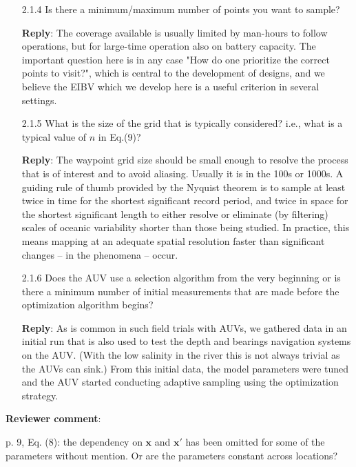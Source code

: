 \documentclass[a4paper]{article}
\newcommand{\bx}{ {\boldsymbol x} }
\def\revcom{\textbf{Reviewer comment}}
\def\reply{\textbf{Reply}}
\begin{document}
\begin{answers}
\begin{itemize}[noitemsep,topsep=0pt,parsep=0pt,partopsep=0pt]
\item[2.1.4] Is there a minimum/maximum number of points you want to sample?\par

\reply: The coverage available is usually limited by man-hours to follow operations, but for large-time operation also on battery capacity. The important question here is in any case "How do one prioritize the correct points to visit?", which is central to the development of designs, and we believe the EIBV which we develop here is a useful criterion in several settings. 
\vspace{1em}

\item[2.1.5] What is the size of the grid that is typically considered? i.e., what is a typical value of $n$ in Eq.(9)?\par 

\reply: The waypoint grid size should be small enough to resolve the process that is of interest and to avoid aliasing. Usually it is in the 100s or 1000s. A guiding rule of thumb provided by the Nyquist theorem is to sample at least twice in time for the shortest significant record period, and twice in space for the shortest significant length to either resolve or eliminate (by filtering) scales of oceanic variability shorter than those being studied. In practice, this means mapping at an adequate spatial resolution faster than significant changes – in the phenomena – occur. 
\vspace{1em}

\item[2.1.6] Does the AUV use a selection algorithm from the very beginning or is there a minimum number of initial measurements that are made before the optimization algorithm begins?\par

\reply: As is common in such field trials with AUVs, we gathered data in an initial run that is also used to test the depth and bearings navigation systems on the AUV. (With the low salinity in the river this is not always trivial as the AUVs can sink.) From this initial data, the model parameters were tuned and the AUV started conducting adaptive sampling using the optimization strategy.
\vspace{1em}

\end{itemize}

\item{\revcom :}\label{r2c2}

p. 9, Eq. (8): the dependency on $\bx$ and $\bx'$ has been omitted for some of the parameters without mention. Or are the parameters constant across locations?


\end{answers}
\end{document}
